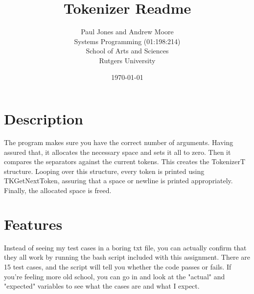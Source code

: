 \documentclass{article}
\title{Tokenizer Readme}
\date{\today}
\author{Paul Jones and Andrew Moore \\ Systems Programming (01:198:214) \\ School of Arts and Sciences \\ Rutgers University}
\begin{document}
\maketitle

\clearpage

\section{Description}

The program makes sure you have the correct number of arguments.
Having assured that, it allocates the necessary space and sets it all to zero.
Then it compares the separators against the current tokens.
This creates the TokenizerT structure.
Looping over this structure, every token is printed using TKGetNextToken,
assuring that a space or newline is printed appropriately.
Finally, the allocated space is freed.

\section{Features}

Instead of seeing my test cases in a boring txt file, you can
actually confirm that they all work by running the bash script
included with this assignment. There are 15 test cases, and the
script will tell you whether the code passes or fails. If you're
feeling more old school, you can go in and look at the "actual"
and "expected" variables to see what the cases are and what I expect.
\end{document}
